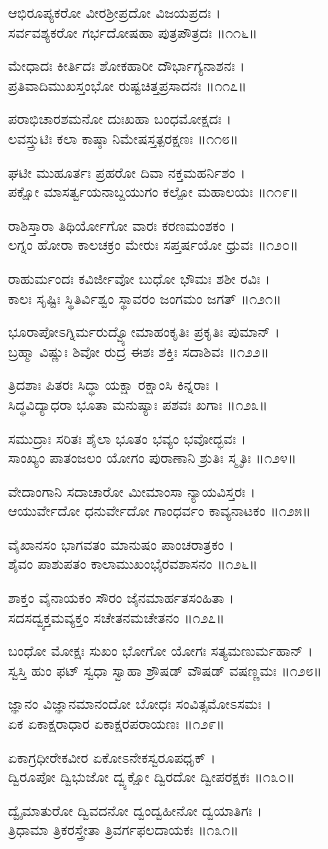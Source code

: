 ಆಭಿರೂಪ್ಯಕರೋ ವೀರಶ್ರೀಪ್ರದೋ ವಿಜಯಪ್ರದಃ ।\\
ಸರ್ವವಶ್ಯಕರೋ ಗರ್ಭದೋಷಹಾ ಪುತ್ರಪೌತ್ರದಃ ॥೧೧೬॥

ಮೇಧಾದಃ ಕೀರ್ತಿದಃ ಶೋಕಹಾರೀ ದೌರ್ಭಾಗ್ಯನಾಶನಃ ।\\
ಪ್ರತಿವಾದಿಮುಖಸ್ತಂಭೋ ರುಷ್ಟಚಿತ್ತಪ್ರಸಾದನಃ ॥೧೧೭॥

ಪರಾಭಿಚಾರಶಮನೋ ದುಃಖಹಾ ಬಂಧಮೋಕ್ಷದಃ ।\\
ಲವಸ್ತ್ರುಟಿಃ ಕಲಾ ಕಾಷ್ಠಾ ನಿಮೇಷಸ್ತತ್ಪರಕ್ಷಣಃ ॥೧೧೮॥

ಘಟೀ ಮುಹೂರ್ತಃ ಪ್ರಹರೋ ದಿವಾ ನಕ್ತಮಹರ್ನಿಶಂ ।\\
ಪಕ್ಷೋ ಮಾಸರ್ತ್ವಯನಾಬ್ದಯುಗಂ ಕಲ್ಪೋ ಮಹಾಲಯಃ ॥೧೧೯॥

ರಾಶಿಸ್ತಾರಾ ತಿಥಿರ್ಯೋಗೋ ವಾರಃ ಕರಣಮಂಶಕಂ ।\\
ಲಗ್ನಂ ಹೋರಾ ಕಾಲಚಕ್ರಂ ಮೇರುಃ ಸಪ್ತರ್ಷಯೋ ಧ್ರುವಃ ॥೧೨೦॥

ರಾಹುರ್ಮಂದಃ ಕವಿರ್ಜೀವೋ ಬುಧೋ ಭೌಮಃ ಶಶೀ ರವಿಃ ।\\
ಕಾಲಃ ಸೃಷ್ಟಿಃ ಸ್ಥಿತಿರ್ವಿಶ್ವಂ ಸ್ಥಾವರಂ ಜಂಗಮಂ ಜಗತ್ ॥೧೨೧॥

ಭೂರಾಪೋಽಗ್ನಿರ್ಮರುದ್ವ್ಯೋಮಾಹಂಕೃತಿಃ ಪ್ರಕೃತಿಃ ಪುಮಾನ್ ।\\
ಬ್ರಹ್ಮಾ ವಿಷ್ಣುಃ ಶಿವೋ ರುದ್ರ ಈಶಃ ಶಕ್ತಿಃ ಸದಾಶಿವಃ ॥೧೨೨॥

ತ್ರಿದಶಾಃ ಪಿತರಃ ಸಿದ್ಧಾ ಯಕ್ಷಾ ರಕ್ಷಾಂಸಿ ಕಿನ್ನರಾಃ ।\\
ಸಿದ್ಧವಿದ್ಯಾಧರಾ ಭೂತಾ ಮನುಷ್ಯಾಃ ಪಶವಃ ಖಗಾಃ ॥೧೨೩॥

ಸಮುದ್ರಾಃ ಸರಿತಃ ಶೈಲಾ ಭೂತಂ ಭವ್ಯಂ ಭವೋದ್ಭವಃ ।\\
ಸಾಂಖ್ಯಂ ಪಾತಂಜಲಂ ಯೋಗಂ ಪುರಾಣಾನಿ ಶ್ರುತಿಃ ಸ್ಮೃತಿಃ ॥೧೨೪॥

ವೇದಾಂಗಾನಿ ಸದಾಚಾರೋ ಮೀಮಾಂಸಾ ನ್ಯಾಯವಿಸ್ತರಃ ।\\
ಆಯುರ್ವೇದೋ ಧನುರ್ವೇದೋ ಗಾಂಧರ್ವಂ ಕಾವ್ಯನಾಟಕಂ ॥೧೨೫॥

ವೈಖಾನಸಂ ಭಾಗವತಂ ಮಾನುಷಂ ಪಾಂಚರಾತ್ರಕಂ ।\\
ಶೈವಂ ಪಾಶುಪತಂ ಕಾಲಾಮುಖಂಭೈರವಶಾಸನಂ ॥೧೨೬॥

ಶಾಕ್ತಂ ವೈನಾಯಕಂ ಸೌರಂ ಜೈನಮಾರ್ಹತಸಂಹಿತಾ ।\\
ಸದಸದ್ವ್ಯಕ್ತಮವ್ಯಕ್ತಂ ಸಚೇತನಮಚೇತನಂ ॥೧೨೭॥

ಬಂಧೋ ಮೋಕ್ಷಃ ಸುಖಂ ಭೋಗೋ ಯೋಗಃ ಸತ್ಯಮಣುರ್ಮಹಾನ್ ।\\
ಸ್ವಸ್ತಿ ಹುಂ ಫಟ್ ಸ್ವಧಾ ಸ್ವಾಹಾ ಶ್ರೌಷಡ್ ವೌಷಡ್ ವಷಣ್ಣಮಃ ॥೧೨೮॥

ಜ್ಞಾನಂ ವಿಜ್ಞಾನಮಾನಂದೋ ಬೋಧಃ ಸಂವಿತ್ಸಮೋಽಸಮಃ ।\\
ಏಕ ಏಕಾಕ್ಷರಾಧಾರ ಏಕಾಕ್ಷರಪರಾಯಣಃ ॥೧೨೯॥

ಏಕಾಗ್ರಧೀರೇಕವೀರ ಏಕೋಽನೇಕಸ್ವರೂಪಧೃಕ್ ।\\
ದ್ವಿರೂಪೋ ದ್ವಿಭುಜೋ ದ್ವ್ಯಕ್ಷೋ ದ್ವಿರದೋ ದ್ವೀಪರಕ್ಷಕಃ ॥೧೩೦॥

ದ್ವೈಮಾತುರೋ ದ್ವಿವದನೋ ದ್ವಂದ್ವಹೀನೋ ದ್ವಯಾತಿಗಃ ।\\
ತ್ರಿಧಾಮಾ ತ್ರಿಕರಸ್ತ್ರೇತಾ ತ್ರಿವರ್ಗಫಲದಾಯಕಃ ॥೧೩೧॥

